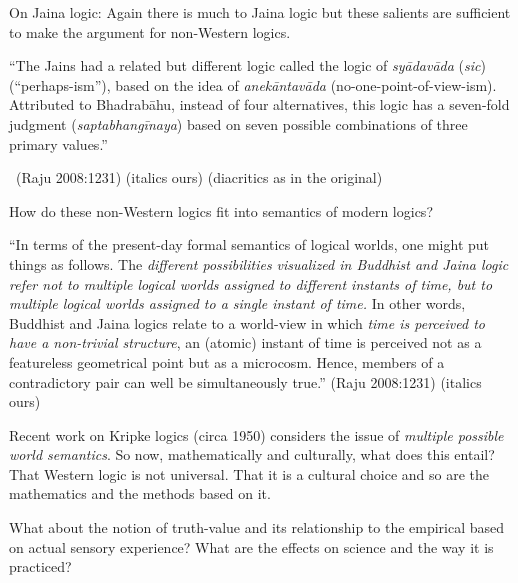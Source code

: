 On Jaina logic: Again there is much to Jaina logic but these salients are sufficient to make the argument for non-Western logics.

\begin{myquote}
“The Jains had a related but different logic called the logic of \textit{syādavāda} (\textit{sic}) (“perhaps-ism”), based on the idea of \textit{anekāntavāda} (no-one-point-of-view-ism). Attributed to Bhadrabāhu, instead of four alternatives, this logic has a seven-fold judgment (\textit{saptabhangīnaya}) based on seven possible combinations of three primary values.” 

~\hfill (Raju 2008:1231) (italics ours) (diacritics as in the original)
\end{myquote}

How do these non-Western logics fit into semantics of modern logics?

\begin{myquote}
“In terms of the present-day formal semantics of logical worlds, one might put things as follows. The \textit{different possibilities visualized in Buddhist and Jaina logic refer not to multiple logical worlds assigned to different instants of time, but to multiple logical worlds assigned to a single instant of time.} In other words, Buddhist and Jaina logics relate to a world-view in which \textit{time is perceived to have a non-trivial structure}, an (atomic) instant of time is perceived not as a featureless geometrical point but as a microcosm. Hence, members of a contradictory pair can well be simultaneously true.” \hfill (Raju 2008:1231) (italics ours)
\end{myquote}

Recent work on Kripke logics (circa 1950) considers the issue of \textit{multiple possible world semantics}. So now, mathematically and culturally, what does this entail? That Western logic is not universal. That it is a cultural choice and so are the mathematics and the methods based on it.

What about the notion of truth-value and its relationship to the empirical based on actual sensory experience? What are the effects on science and the way it is practiced?

